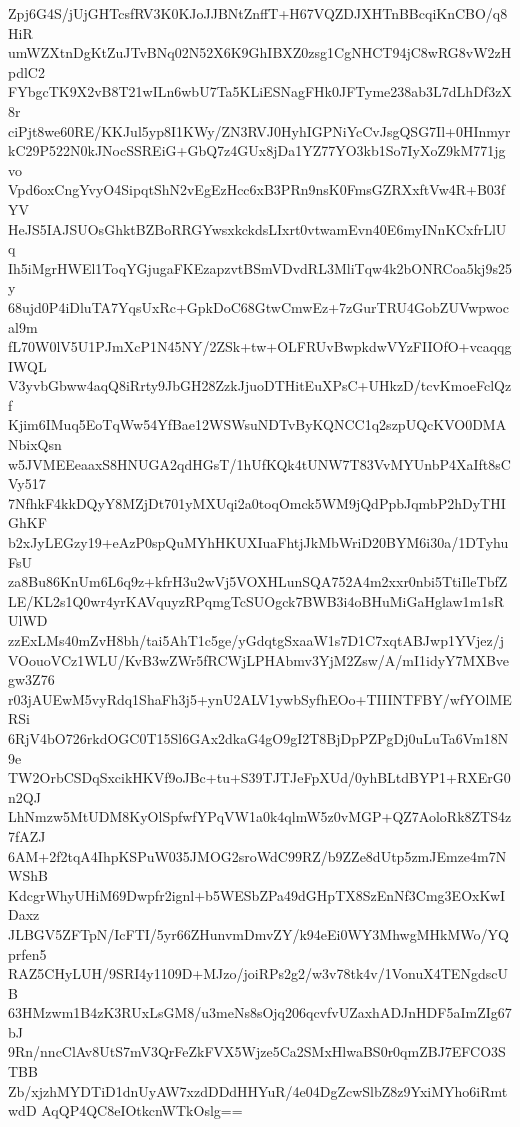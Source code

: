 Zpj6G4S/jUjGHTcsfRV3K0KJoJJBNtZnffT+H67VQZDJXHTnBBcqiKnCBO/q8HiR
umWZXtnDgKtZuJTvBNq02N52X6K9GhIBXZ0zsg1CgNHCT94jC8wRG8vW2zHpdlC2
FYbgcTK9X2vB8T21wILn6wbU7Ta5KLiESNagFHk0JFTyme238ab3L7dLhDf3zX8r
ciPjt8we60RE/KKJul5yp8I1KWy/ZN3RVJ0HyhIGPNiYcCvJsgQSG7Il+0HInmyr
kC29P522N0kJNocSSREiG+GbQ7z4GUx8jDa1YZ77YO3kb1So7IyXoZ9kM771jgvo
Vpd6oxCngYvyO4SipqtShN2vEgEzHcc6xB3PRn9nsK0FmsGZRXxftVw4R+B03fYV
HeJS5IAJSUOsGhktBZBoRRGYwsxkckdsLIxrt0vtwamEvn40E6myINnKCxfrLlUq
Ih5iMgrHWEl1ToqYGjugaFKEzapzvtBSmVDvdRL3MliTqw4k2bONRCoa5kj9s25y
68ujd0P4iDluTA7YqsUxRc+GpkDoC68GtwCmwEz+7zGurTRU4GobZUVwpwocal9m
fL70W0lV5U1PJmXcP1N45NY/2ZSk+tw+OLFRUvBwpkdwVYzFIIOfO+vcaqqgIWQL
V3yvbGbww4aqQ8iRrty9JbGH28ZzkJjuoDTHitEuXPsC+UHkzD/tcvKmoeFclQzf
Kjim6IMuq5EoTqWw54YfBae12WSWsuNDTvByKQNCC1q2szpUQcKVO0DMANbixQsn
w5JVMEEeaaxS8HNUGA2qdHGsT/1hUfKQk4tUNW7T83VvMYUnbP4XaIft8sCVy517
7NfhkF4kkDQyY8MZjDt701yMXUqi2a0toqOmck5WM9jQdPpbJqmbP2hDyTHIGhKF
b2xJyLEGzy19+eAzP0spQuMYhHKUXIuaFhtjJkMbWriD20BYM6i30a/1DTyhuFsU
za8Bu86KnUm6L6q9z+kfrH3u2wVj5VOXHLunSQA752A4m2xxr0nbi5TtiIleTbfZ
LE/KL2s1Q0wr4yrKAVquyzRPqmgTcSUOgck7BWB3i4oBHuMiGaHglaw1m1sRUlWD
zzExLMs40mZvH8bh/tai5AhT1c5ge/yGdqtgSxaaW1s7D1C7xqtABJwp1YVjez/j
VOouoVCz1WLU/KvB3wZWr5fRCWjLPHAbmv3YjM2Zsw/A/mI1idyY7MXBvegw3Z76
r03jAUEwM5vyRdq1ShaFh3j5+ynU2ALV1ywbSyfhEOo+TIIINTFBY/wfYOlMERSi
6RjV4bO726rkdOGC0T15Sl6GAx2dkaG4gO9gI2T8BjDpPZPgDj0uLuTa6Vm18N9e
TW2OrbCSDqSxcikHKVf9oJBc+tu+S39TJTJeFpXUd/0yhBLtdBYP1+RXErG0n2QJ
LhNmzw5MtUDM8KyOlSpfwfYPqVW1a0k4qlmW5z0vMGP+QZ7AoloRk8ZTS4z7fAZJ
6AM+2f2tqA4IhpKSPuW035JMOG2sroWdC99RZ/b9ZZe8dUtp5zmJEmze4m7NWShB
KdcgrWhyUHiM69Dwpfr2ignl+b5WESbZPa49dGHpTX8SzEnNf3Cmg3EOxKwIDaxz
JLBGV5ZFTpN/IcFTI/5yr66ZHunvmDmvZY/k94eEi0WY3MhwgMHkMWo/YQprfen5
RAZ5CHyLUH/9SRI4y1109D+MJzo/joiRPs2g2/w3v78tk4v/1VonuX4TENgdscUB
63HMzwm1B4zK3RUxLsGM8/u3meNs8sOjq206qcvfvUZaxhADJnHDF5aImZIg67bJ
9Rn/nncClAv8UtS7mV3QrFeZkFVX5Wjze5Ca2SMxHlwaBS0r0qmZBJ7EFCO3STBB
Zb/xjzhMYDTiD1dnUyAW7xzdDDdHHYuR/4e04DgZcwSlbZ8z9YxiMYho6iRmtwdD
AqQP4QC8eIOtkcnWTkOslg==
